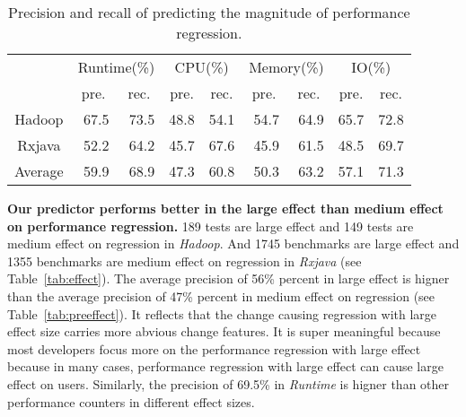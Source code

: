 \begin{table}[]
	\centering
	\footnotesize
	\caption{Precision and recall of predicting the magnitude of performance regression.}
	\label{tab:ordinal}
\begin{tabular}{|c|r|r|r|r|r|r|r|r|}
	\hline
	\multirow{2}{*}{}             & \multicolumn{2}{c|}{Runtime(\%)}                      & \multicolumn{2}{c|}{CPU(\%)}                          & \multicolumn{2}{c|}{Memory(\%)}                       & \multicolumn{2}{c|}{IO(\%)}                           \\ \cline{2-9} 
	& \multicolumn{1}{c|}{pre.} & \multicolumn{1}{c|}{rec.} & \multicolumn{1}{c|}{pre.} & \multicolumn{1}{c|}{rec.} & \multicolumn{1}{c|}{pre.} & \multicolumn{1}{c|}{rec.} & \multicolumn{1}{c|}{pre.} & \multicolumn{1}{c|}{rec.} \\ \hline
	Hadoop                        & 67.5                      & 73.5                      & 48.8                      & 54.1                      & 54.7                      & 64.9                      & 65.7                      & 72.8                      \\ \hline
	Rxjava                        & 52.2                      & 64.2                      & 45.7                      & 67.6                      & 45.9                      & 61.5                      & 48.5                      & 69.7                      \\ \hline
	\multicolumn{1}{|l|}{Average} & 59.9                      & 68.9                      & 47.3                      & 60.8                      & 50.3                      & 63.2                      & 57.1                      & 71.3                      \\ \hline
\end{tabular}
\end{table}

\textbf{Our predictor performs better in the large effect than medium effect on performance regression.} 189 tests are large effect and 149 tests are medium effect on regression in \emph{Hadoop}. And 1745 benchmarks are large effect and 1355 benchmarks are medium effect on regression in \emph{Rxjava} (see Table~\ref{tab:effect}). The average precision of 56\% percent in large effect is higner than the average precision of 47\% percent in medium effect on regression (see Table~\ref{tab:preeffect}). It reflects that the change causing regression with large effect size carries more abvious change features. It is super meaningful because most developers focus more on the performance regression with large effect because in many cases, performance regression with large effect can cause large effect on users. Similarly, the precision of 69.5\% in \emph{Runtime} is higner than other performance counters in different effect sizes.

